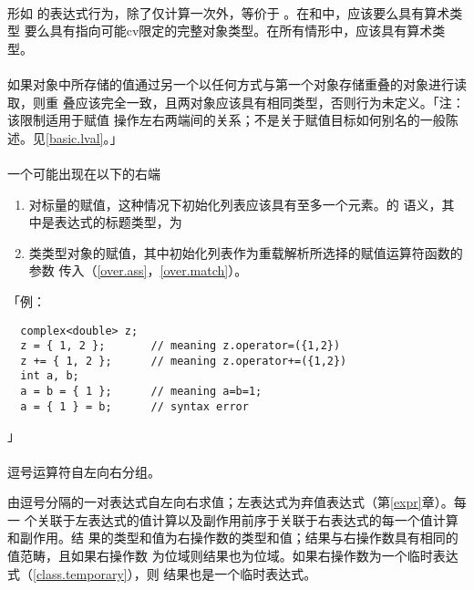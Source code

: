 \paragraph{}
形如 \tm{=} 的表达式行为，除了仅计算一次外，等价于
  。在\tm{+=}和\tm{-=}中，应该要么具有算术类型
要么具有指向可能cv限定的完整对象类型。在所有情形中，应该具有算术类型。

\paragraph{}
如果对象中所存储的值通过另一个以任何方式与第一个对象存储重叠的对象进行读取，则重
叠应该完全一致，且两对象应该具有相同类型，否则行为未定义。「注：该限制适用于赋值
操作左右两端间的关系；不是关于赋值目标如何别名的一般陈述。见\ref{basic.lval}。」

\paragraph{}
一个可能出现在以下的右端
\begin{enumerate}
  \item{对标量的赋值，这种情况下初始化列表应该具有至多一个元素。的
    语义，其中是表达式的标题类型，为}
  \item{类类型对象的赋值，其中初始化列表作为重载解析所选择的赋值运算符函数的参数
    传入（\ref{over.ass}，\ref{over.match}）。}
\end{enumerate}
「例：
\begin{lstlisting}
  complex<double> z;
  z = { 1, 2 };       // meaning z.operator=({1,2})
  z += { 1, 2 };      // meaning z.operator+=({1,2})
  int a, b;
  a = b = { 1 };      // meaning a=b=1;
  a = { 1 } = b;      // syntax error
\end{lstlisting}」

\paragraph{}
逗号运算符自左向右分组。


由逗号分隔的一对表达式自左向右求值；左表达式为弃值表达式（第\ref{expr}章）。每一
个关联于左表达式的值计算以及副作用前序于关联于右表达式的每一个值计算和副作用。结
果的类型和值为右操作数的类型和值；结果与右操作数具有相同的值范畴，且如果右操作数
为位域则结果也为位域。如果右操作数为一个临时表达式（\ref{class.temporary}），则
结果也是一个临时表达式。


